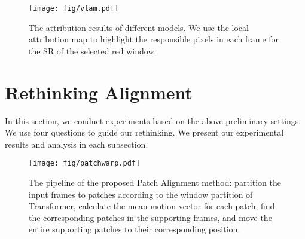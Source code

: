 \documentclass{article}
\begin{document}
\begin{figure}[t]
    \centering
    \texttt{[image: fig/vlam.pdf]}
    \vspace{-5mm}
    \caption{The attribution results of different models. We use the local attribution map \cite{gu2021interpreting} to highlight the responsible pixels in each frame for the SR of the selected red window.}
    \label{fig:vlam}
    \vspace{-6mm}
\end{figure}


\begin{table}[t]
    \footnotesize
    \centering
    \caption{Comparison of VSR Transformers with different alignment methods on the REDS4 dataset.}
    \label{tab:3-10sliding}
    \vspace{1mm}
    \vspace{-6mm}
\end{table}

\vspace{-3mm}
\section{Rethinking Alignment}
\label{sec:analysis}
\vspace{-2mm}
In this section, we conduct experiments based on the above preliminary settings. We use four questions to guide our rethinking. We present our experimental results and analysis in each subsection.


\begin{figure}[t]
    \centering
    \texttt{[image: fig/patchwarp.pdf]}
\caption{The pipeline of the proposed Patch Alignment method:
     partition the input frames to patches according to the window partition of Transformer,
     calculate the mean motion vector for each patch,
     find the corresponding patches in the supporting frames, and
     move the entire supporting patches to their corresponding position.}
    \label{fig:patch-warp}
    \vspace{-2mm}
\end{figure}
\end{document}
